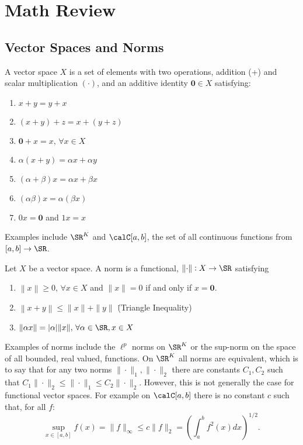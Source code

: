 \section{Math Review}%
\label{sec:math-review}

\subsection{Vector Spaces and Norms}%

\begin{definition}
	\label{def:vector-space}
	A vector space \(X\) is a set of elements with two operations, addition (+) and scalar multiplication  \((\cdot)\), and an additive identity \(\mathbf{0} \in X\) satisfying:
	 \begin{enumerate}
		 \item \( x + y = y+ x\) 
		 \item \((x+y)+z = x + (y+z)\)
		 \item \( \mathbf{0} + x = x,\, \forall x \in X\)
		 \item \(\alpha(x+y) = \alpha x + \alpha y\)
		 \item \((\alpha + \beta)x = \alpha x + \beta x\)
		 \item \((\alpha\beta)x = \alpha(\beta x)\)
		 \item \(0x = \mathbf{0}\) and  \(1x = x\) 
	\end{enumerate}
\end{definition}
Examples include \(\SR^K\) and  \(\calC[a,b]\), the set of all continuous functions from \([a,b] \to \SR\).
\begin{definition}[Norm]
	\label{def:norm}
	Let \(X\) be a vector space.  A norm is a functional,  \(\left\|\cdot\right\|:X \to \SR\) satisfying
	\begin{enumerate}
		\item \(\left\|x\right\|\geq 0,\,\forall x \in X\) and \(\|x\|=0\) if and only if \(x = \mathbf{0}\).
		\item \(\left\|x+y\right\|\leq \|x\| + \|y\|\) \. (Triangle Inequality) 
		\item \(\|\alpha x\| = |\alpha|\|x\|,\,\forall \alpha \in \SR, x \in X\)
	\end{enumerate}
\end{definition}
Examples of norms include the \(\ell^p\) norms on  \(\SR^K\) or the sup-norm on the space of all bounded, real valued, functions. On \(\SR^K\) all norms are equivalent, which is to say that for any two norms  \(\|\cdot\|_1, \|\cdot\|_2\) there are constants \(C_1, C_2\) such that  \(C_1\|\cdot\|_2 \leq \|\cdot\|_1 \leq C_2 \|\cdot\|_2\). However, this is not generally the case for functional vector spaces. For example on \(\calC[a,b]\) there is no constant \(c\) such that, for all \(f\):
 \[
	 \sup_{x\in[a,b]}f(x) = \|f\|_\infty \leq c \|f\|_2 = \left(\int_{a}^{b} f^2(x) dx\right)^{1/2}
.\] 

